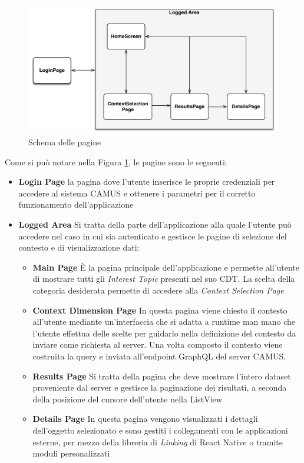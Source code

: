 \begin{figure}[H]
	\centering
	\includegraphics[width=\textwidth]{4-progettazione-alto-livello/Immagini/screen_schema.pdf}
	\caption{Schema delle pagine}\label{fig:screen-schema}
\end{figure}

Come si può notare nella Figura \ref{fig:screen-schema}, le pagine sono le seguenti:

\begin{itemize}
	\item \textbf{Login Page}
	\upe la pagina dove l'utente inserisce le proprie credenziali per accedere al sistema CAMUS e ottenere i parametri per il corretto funzionamento dell'applicazione
	\item \textbf{Logged Area}
	Si tratta della parte dell'applicazione alla quale l'utente può accedere nel caso in cui sia autenticato e gestisce le pagine di selezione del contesto e di visualizzazione dati:
	\begin{itemize}
		\item \textbf{Main Page}
		È la pagina principale dell'applicazione e permette all'utente di mostrare tutti gli \emph{Interest Topic} presenti nel suo CDT. La scelta della categoria desiderata permette di accedere alla \emph{Context Selection Page}
		\item \textbf{Context Dimension Page}
		In questa pagina viene chiesto il contesto all'utente mediante un'interfaccia che si adatta a runtime man mano che l'utente effettua delle scelte per guidarlo nella definizione del contesto da inviare come richiesta al server. Una volta composto il contesto viene costruita la query e inviata all'endpoint GraphQL del server CAMUS. 
		\item \textbf{Results Page}
		Si tratta della pagina che deve mostrare l'intero dataset proveniente dal server e gestisce la paginazione dei risultati, a seconda della posizione del cursore dell'utente nella ListView 
		\item \textbf{Details Page}
		In questa pagina vengono visualizzati i dettagli dell'oggetto selezionato e sono gestiti i collegamenti con le applicazioni esterne, per mezzo della libreria di \emph{Linking} di React Native o tramite moduli personalizzati
	\end{itemize}
\end{itemize}

